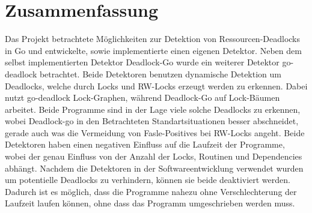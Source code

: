 \chapter{Zusammenfassung}
Das Projekt betrachtete Möglichkeiten zur Detektion von Ressourcen-Deadlocks
in Go und entwickelte, sowie implementierte einen eigenen Detektor. Neben dem 
selbst implementierten Detektor Deadlock-Go wurde ein weiterer Detektor go-deadlock
betrachtet. Beide Detektoren benutzen dynamische Detektion um Deadlocks, welche 
durch Locks und RW-Locks erzeugt werden zu erkennen. Dabei nutzt go-deadlock 
Lock-Graphen, während Deadlock-Go auf Lock-Bäumen arbeitet. Beide Programme sind 
in der Lage viele solche Deadlocks zu erkennen, wobei Deadlock-go in den 
Betrachteten Standartsituationen besser abschneidet, gerade auch was die
Vermeidung von Fasle-Positives bei RW-Locks angeht. Beide Detektoren 
haben einen negativen Einfluss auf die Laufzeit der Programme, wobei der 
genau Einfluss von der Anzahl der Locks, Routinen und Dependencies abhängt.
Nachdem die Detektoren in der Softwareentwicklung verwendet wurden um potentielle 
Deadlocks zu verhindern, können sie beide deaktiviert werden. Dadurch ist es 
möglich, dass die Programme nahezu ohne Verschlechterung der Laufzeit laufen 
können, ohne dass das Programm umgeschrieben werden muss.